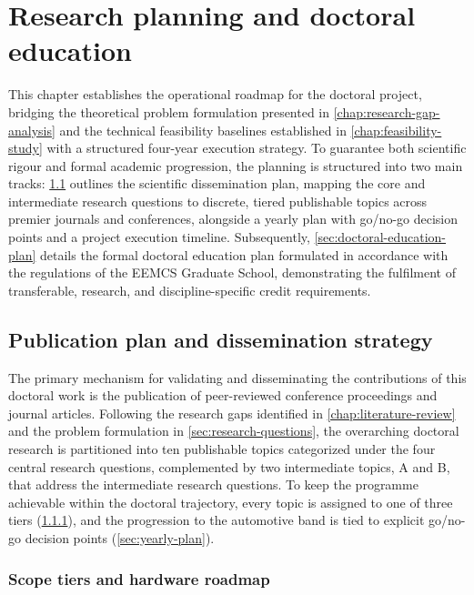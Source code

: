 \chapter{Research planning and doctoral education}
\label{chap:research-planning}

This chapter establishes the operational roadmap for the doctoral project, bridging the theoretical problem formulation presented in \cref{chap:research-gap-analysis} and the technical feasibility baselines established in \cref{chap:feasibility-study} with a structured four-year execution strategy.
To guarantee both scientific rigour and formal academic progression, the planning is structured into two main tracks:
\cref{sec:publication-plan} outlines the scientific dissemination plan, mapping the core and intermediate research questions to discrete, tiered publishable topics across premier journals and conferences, alongside a yearly plan with go/no-go decision points and a project execution timeline.
Subsequently, \cref{sec:doctoral-education-plan} details the formal doctoral education plan formulated in accordance with the regulations of the EEMCS Graduate School, demonstrating the fulfilment of transferable, research, and discipline-specific credit requirements.


\section{Publication plan and dissemination strategy}
\label{sec:publication-plan}

The primary mechanism for validating and disseminating the contributions of this doctoral work is the publication of peer-reviewed conference proceedings and journal articles.
Following the research gaps identified in \cref{chap:literature-review} and the problem formulation in \cref{sec:research-questions}, the overarching doctoral research is partitioned into ten publishable topics categorized under the four central research questions, complemented by two intermediate topics, A and B, that address the intermediate research questions.
To keep the programme achievable within the doctoral trajectory, every topic is assigned to one of three tiers (\cref{sec:scope-tiers}), and the progression to the automotive band is tied to explicit go/no-go decision points (\cref{sec:yearly-plan}).


\subsection{Scope tiers and hardware roadmap}
\label{sec:scope-tiers}

